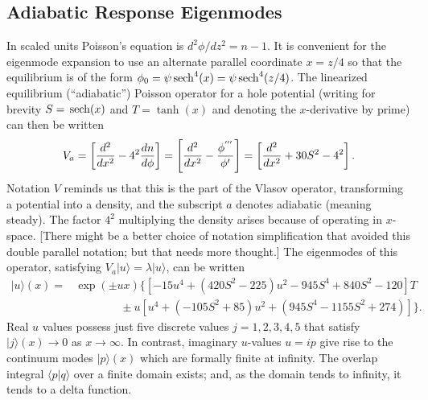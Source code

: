 \documentclass[12pt]{article}
\def\ket#1{|#1\rangle}
\def\bra#1{\langle#1}
\def\sech{{\,\rm sech}}
\begin{document}
\subsection{Adiabatic Response Eigenmodes}
In scaled units Poisson's equation is $d^2\phi/dz^2=n-1$. It is
convenient for the eigenmode expansion to use an alternate parallel coordinate
$x=z/4$ so that the equilibrium is of the form
$\phi_0=\psi\sech^4(x)=\psi\sech^4(z/4)$.  The linearized equilibrium
(``adiabatic'') Poisson operator for a hole potential (writing for brevity
$S=\sech(x)$ and $T=\tanh(x)$ and denoting the $x$-derivative by
prime) can then be written
\begin{equation}
  \label{eq:1}
  V_a = \left[{d^2\over dx^2} - 4^2{dn\over d\phi}\right]
  = \left[{d^2\over dx^2} - {\phi^{'''}\over \phi'}\right]
  = \left[{d^2\over dx^2} +30S^2- 4^2\right].
\end{equation}
Notation $V$ reminds us that this is the part of the Vlasov operator,
transforming a potential into a density, and the subscript $a$ denotes
adiabatic (meaning steady). The factor $4^2$ multiplying the density arises
because of operating in $x$-space. [There might be a better choice of
notation simplification that avoided this double parallel notation;
but that needs more thought.]  The eigenmodes of this operator, satisfying
$V_a\ket{u}=\lambda \ket{u}$, can be written
\begin{equation}
  \label{eq:2}
  \begin{split}
 \ket{u}(x)= &\exp(\pm ux)\{[-15u^4 + (420S^2 - 225)u^2 - 945S^4 +
 840S^2 - 120]T \\
 &\qquad\qquad\pm u[u^4 + (-105S^2 + 85)u^2 + (945S^4 - 1155S^2
 +274)]\}
.
  \end{split}
\end{equation}
Real $u$ values possess just five discrete values $j=1,2,3,4,5$ that
satisfy $\ket{j}(x)\to0$ as $x\to\infty$. In contrast, imaginary
$u$-values $u=ip$ give rise to the continuum modes $\ket{p}(x)$ which
are formally finite at infinity. The overlap integral $\bra{p}\ket{q}$
over a finite domain exists; and, as the domain tends to infinity, it tends
to a delta function.
\end{document}
